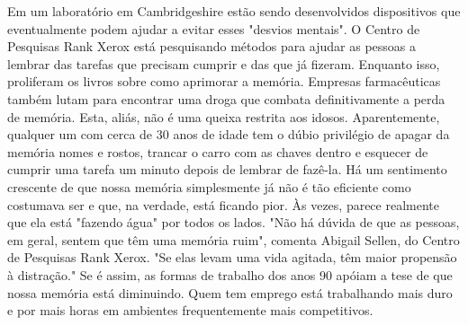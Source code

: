 Em um laboratório em Cambridgeshire estão sendo desenvolvidos dispositivos que eventualmente podem ajudar a evitar esses "desvios mentais".
O Centro de Pesquisas Rank Xerox está pesquisando métodos para ajudar as pessoas a lembrar das tarefas que precisam cumprir e das que já fizeram.
Enquanto isso, proliferam os livros sobre como aprimorar a memória. Empresas farmacêuticas também lutam para encontrar uma droga que combata definitivamente a perda de memória.
Esta, aliás, não é uma queixa restrita aos idosos. Aparentemente, qualquer um com cerca de 30 anos de idade tem o dúbio privilégio de apagar da memória nomes e rostos, trancar o carro com as chaves dentro e esquecer de cumprir uma tarefa um minuto depois de lembrar de fazê-la.
Há um sentimento crescente de que nossa memória simplesmente já não é tão eficiente como costumava ser e que, na verdade, está ficando pior. Às vezes, parece realmente que ela está "fazendo água" por todos os lados.
"Não há dúvida de que as pessoas, em geral, sentem que têm uma memória ruim", comenta Abigail Sellen, do Centro de Pesquisas Rank Xerox. "Se elas levam uma vida agitada, têm maior propensão à distração."
Se é assim, as formas de trabalho dos anos 90 apóiam a tese de que nossa memória está diminuindo. Quem tem emprego está trabalhando mais duro e por mais horas em ambientes frequentemente mais competitivos.

